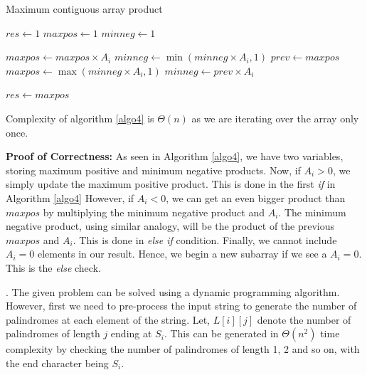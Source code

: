 \documentclass[assign]{article}
\begin{document}
\begin{algorithm}
  \caption{Maximum contiguous array product}
  $res \gets 1$\;
  $maxpos \gets 1$ 
  $minneg \gets 1$ 
 
   {
        {
            $maxpos \gets maxpos \times A_i$\;
            $minneg \gets \min{(minneg \times A_i, 1)}$\;
        }  {
            $prev \gets maxpos$\;
            $maxpos \gets \max{(minneg \times A_i,1)}$\;
            $minneg \gets prev \times A_i$\;
        } 

         {
             $res \gets maxpos$ \;
         }
  } 
  \label{algo4}
\end{algorithm}
\vspace{-10pt}

Complexity of algorithm \ref{algo4} is $\Theta(n)$ as we are iterating over the array only once.

\noindent \textbf{Proof of Correctness:} As seen in Algorithm \ref{algo4}, we have two variables, storing maximum positive and minimum negative products. Now, if $A_i > 0$, we simply update the maximum positive product. This is done in the first {\em if} in Algorithm \ref{algo4} However, if $A_i < 0$, we can get an even bigger product than $maxpos$ by multiplying the minimum negative product and $A_i$. The minimum negative product, using similar analogy, will be the product of the previous $maxpos$ and $A_i$. This is done in {\em else if} condition. Finally, we cannot include $A_i = 0$ elements in our result. Hence, we begin a new subarray if we see a $A_i = 0$. This is the {\em else} check.

\vspace{10pt}

. The given problem can be solved using a dynamic programming algorithm. However, first we need to pre-process the input string to generate the number of palindromes at each element of the string. Let, $L[i][j]$ denote the number of palindromes of length $j$ ending at $S_i$. This can be generated in $\Theta(n^2)$ time complexity by checking the number of palindromes of length 1, 2 and so on, with the end character being $S_i$. 
\end{document}
